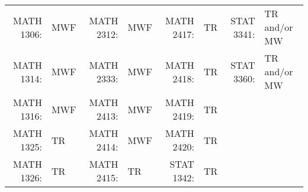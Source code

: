 \begin{tabular}{|rl|rl|rl|rl|}
    \hline
    MATH 1306: & MWF & MATH 2312: & MWF & MATH 2417: & TR & STAT 3341: & TR and/or MW \\
    MATH 1314: & MWF & MATH 2333: & MWF & MATH 2418: & TR & STAT 3360: & TR and/or MW \\
    MATH 1316: & MWF & MATH 2413: & MWF & MATH 2419: & TR &  &  \\
    MATH 1325: & TR & MATH 2414: & MWF & MATH 2420: & TR &  &  \\
    MATH 1326: & TR & MATH 2415: & TR & STAT 1342: & TR &  &  \\
%
    \hline
\end{tabular}
